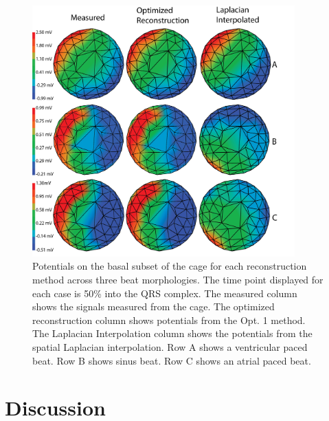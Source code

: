 \documentclass[12pt]{article}
\begin{document}
\begin{figure}[h]
	\includegraphics[width=0.9\textwidth]{Figures/Figure1.png}
	\caption{Potentials on the basal subset of the cage for each
		reconstruction method across three beat morphologies. The time point
		displayed for each case is 50\% into the QRS complex. The measured
		column shows the signals measured from the cage. The optimized
		reconstruction column shows potentials from the Opt. 1 method. The
		Laplacian Interpolation column shows the potentials from the spatial
		Laplacian interpolation. Row A shows a ventricular paced beat. Row B
		shows sinus beat. Row C shows an atrial paced beat.}
	\label{Fig:Res}
\end{figure}


\section{Discussion}




\end{document}
